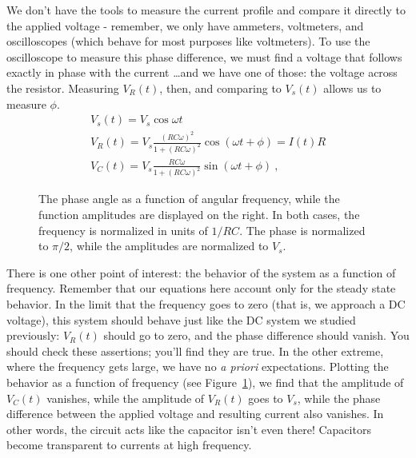 \documentclass[12pt]{article}
\begin{document}
We don't have the tools to measure the current profile and compare it
directly to the applied voltage - remember, we only have ammeters,
voltmeters, and oscilloscopes (which behave for most purposes like
voltmeters).  To use the oscilloscope to measure this phase
difference, we must find a voltage that follows exactly in phase with
the current \ldots and we have one of those: the voltage across the
resistor.  Measuring $V_R(t)$, then, and comparing to $V_s(t)$ allows
us to measure $\phi$.  
\begin{gather*}
  V_s(t) = V_s \cos \omega t\\
  V_R(t) = V_s \frac{(RC\omega)^2}{1+(RC\omega)^2} \cos( \omega t
  + \phi) = I(t) R\\
  V_C(t) = V_s \frac{RC\omega}{1+(RC\omega)^2} \sin( \omega t + \phi)\ ,
\end{gather*}

\begin{figure}
  \centering
   \qquad
  \caption{The phase angle as a function of angular frequency, while
    the function amplitudes are displayed on the right.  In both
    cases, the frequency is normalized in units of $1/RC$.  The phase
    is normalized to $\pi/2$, while the amplitudes are normalized to
    $V_s$.}
  \label{fig:frequency}
\end{figure}
There is one other point of interest: the behavior of the system as a
function of frequency.  Remember that our equations here account only
for the steady state behavior.  In the limit that the frequency goes
to zero (that is, we approach a DC voltage), this system should behave
just like the DC system we studied previously: $V_R(t)$ should go to
zero, and the phase difference should vanish.  You should check these
assertions; you'll find they are true.  In the other extreme, where
the frequency gets large, we have no \textit{a priori} expectations.
Plotting the behavior as a function of frequency (see
Figure~\ref{fig:frequency}), we find that the amplitude of $V_C(t)$
vanishes, while the amplitude of $V_R(t)$ goes to $V_s$, while the
phase difference between the applied voltage and resulting current
also vanishes.  In other words, the circuit acts like the capacitor
isn't even there!  Capacitors become transparent to currents at high
frequency.
\end{document}
